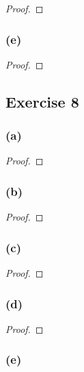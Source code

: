 \documentclass[14pt]{extarticle}
\begin{document}
\begin{proof}

\end{proof}

\subsubsection{(e)}

\begin{proof}

\end{proof}

\subsection{Exercise 8}

\subsubsection{(a)}

\begin{proof}

\end{proof}

\subsubsection{(b)}

\begin{proof}

\end{proof}

\subsubsection{(c)}

\begin{proof}

\end{proof}

\subsubsection{(d)}

\begin{proof}

\end{proof}

\subsubsection{(e)}
\end{document}
